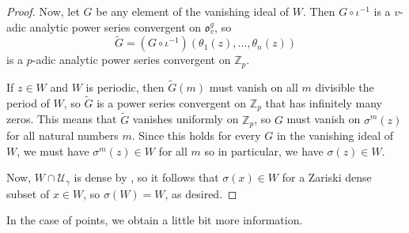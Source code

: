 \documentclass{amsart}
\newcommand{\bZ} {\mathbb{Z}}
\newcommand{\cU}{\mathcal{U}}
\newcommand{\tG}{\tilde G}
\newcommand{\fo}{\mathfrak o}
\theoremstyle{definition}
\begin{document}
\begin{proof}
Now, let $G$ be any element of the vanishing ideal of $W$.  Then
$G \circ \iota^{-1}$ is a $v$-adic analytic power series
convergent on $\fo_v^g$, so
\[ \tG = (G \circ \iota^{-1}) (\theta_1(z), \dots, \theta_n(z))\] is a
$p$-adic analytic power series convergent on $\bZ_p$.


If $z \in W$ and $W$ is periodic, then $\tG(m)$ must vanish on all $m$
divisible the period of $W$, so $\tG$ is a power series convergent on
$\bZ_p$ that has infinitely many zeros.  This means that $\tG$
vanishes uniformly on $\bZ_p$, so $G$ must vanish on $\sigma^m(z)$ for
all natural numbers $m$.  Since this holds for every $G$ in the
vanishing ideal of $W$, we must have $\sigma^m(z) \in W$ for all $m$
so in particular, we have $\sigma(z) \in W$.

Now, $W \cap \cU_\gamma$ is dense by \cite[Proposition 2.3]{BGT2}, so
it follows that $\sigma(x) \in W$ for a Zariski dense subset of $x \in W$,
so $\sigma(W) = W$, as desired.

\end{proof}


In the case of points, we obtain a little bit more information.  
\end{document}
